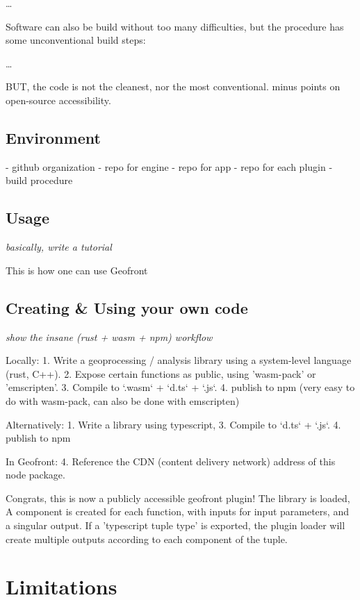 \dots

Software can also be build without too many difficulties, but the procedure has some unconventional build steps: 

\dots

BUT, the code is not the cleanest, nor the most conventional. minus points on open-source accessibility.



\subsection{Environment}%
- github organization 
- repo for engine 
- repo for app 
- repo for each plugin
- build procedure

\subsection{Usage}%

\emph{basically, write a tutorial}

This is how one can use Geofront

\subsection{Creating \& Using your own code}
\emph{show the insane (rust + wasm + npm) workflow}

Locally: 
1. Write a geoprocessing / analysis library using a system-level language (rust, C++).
2. Expose certain functions as public, using 'wasm-pack' or 'emscripten'.
3. Compile to `.wasm` + `d.ts` + `.js`.
4. publish to npm (very easy to do with wasm-pack, can also be done with emscripten)

Alternatively: 
1. Write a library using typescript, 
3. Compile to `d.ts` + `.js`.
4. publish to npm 

In Geofront: 
4. Reference the CDN (content delivery network) address of this node package. 

Congrats, this is now a publicly accessible geofront plugin!
The library is loaded, A component is created for each function, with inputs for input parameters, and a singular output. If a 'typescript tuple type' is exported, the plugin loader will create multiple outputs according to each component of the tuple.

\section{Limitations}%

